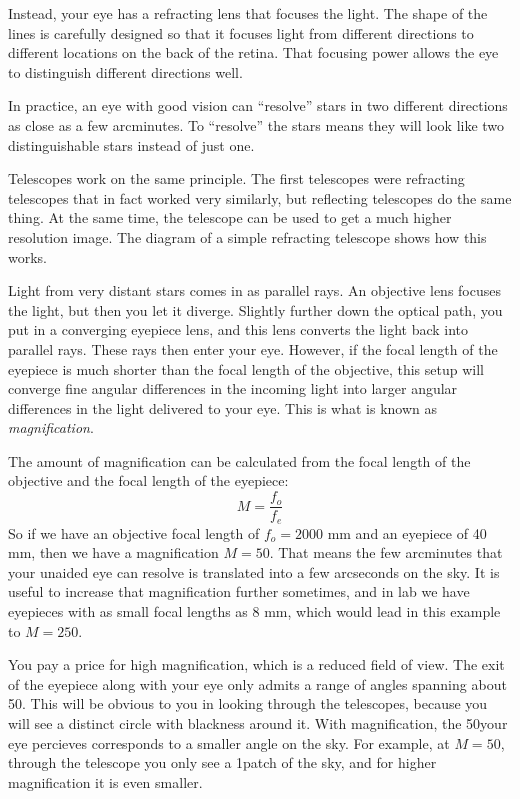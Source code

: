 \documentclass[12pt, preprint]{aastex}
\begin{document}
Instead, your eye has a refracting lens that focuses the light. The
shape of the lines is carefully designed so that it focuses light from
different directions to different locations on the back of the
retina. That focusing power allows the eye to distinguish different
directions well.

In practice, an eye with good vision can ``resolve'' stars in two
different directions as close as a few arcminutes. To ``resolve''
the stars means they will look like two distinguishable stars instead
of just one. 

Telescopes work on the same principle. The first telescopes were
refracting telescopes that in fact worked very similarly, but
reflecting telescopes do the same thing. At the same time, the
telescope can be used to get a much higher resolution image. The
diagram of a simple refracting telescope shows how this works.

Light from very distant stars comes in as parallel rays. An objective
lens focuses the light, but then you let it diverge. Slightly further
down the optical path, you put in a converging eyepiece lens, and this
lens converts the light back into parallel rays. These rays then enter
your eye. However, if the focal length of the eyepiece is much shorter
than the focal length of the objective, this setup will converge fine
angular differences in the incoming light into larger angular
differences in the light delivered to your eye. This is what is known
as {\it magnification}.

The amount of magnification can be calculated from the focal length of
the objective and the focal length of the eyepiece:
\begin{equation}
\label{eq:magnification}
M = \frac{f_o}{f_e}
\end{equation}
So if we have an objective focal length of $f_o = 2000$ mm and an
eyepiece of 40 mm, then we have a magnification $M=50$. That means the
few arcminutes that your unaided eye can resolve is translated into a
few arcseconds on the sky. It is useful to increase that magnification further
sometimes, and in lab we have eyepieces with as small focal lengths as
8 mm, which would lead in this example to $M=250$.

You pay a price for high magnification, which is a reduced field of
view. The exit of the eyepiece along with your eye only admits a range
of angles spanning about 50\degree. This will be obvious to you in
looking through the telescopes, because you will see a distinct circle
with blackness around it. With magnification, the 50\degree your eye
percieves corresponds to a smaller angle on the sky. For example, at
$M=50$, through the telescope you only see a 1\degree patch of the
sky, and for higher magnification it is even smaller.
\end{document}
